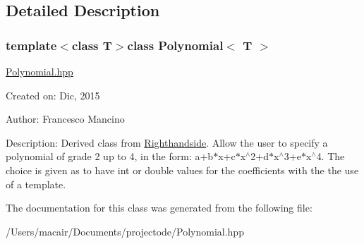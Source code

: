 \subsection{Detailed Description}
\subsubsection*{template$<$class T$>$class Polynomial$<$ T $>$}

\hyperlink{_polynomial_8hpp_source}{Polynomial.\+hpp}

Created on\+: Dic, 2015 \begin{DoxyVerb}Author: Francesco Mancino
\end{DoxyVerb}


Description\+: Derived class from \hyperlink{class_righthandside}{Righthandside}. Allow the user to specify a polynomial of grade 2 up to 4, in the form\+: a+b$\ast$x+c$\ast$x$^\wedge$2+d$\ast$x$^\wedge$3+e$\ast$x$^\wedge$4. The choice is given as to have int or double values for the coefficients with the the use of a template. 

The documentation for this class was generated from the following file\+:\begin{DoxyCompactItemize}
\item 
/\+Users/macair/\+Documents/projectode/Polynomial.\+hpp\end{DoxyCompactItemize}
